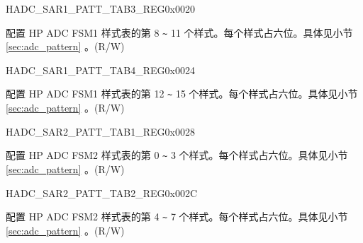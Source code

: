 \begin{register}{H}{ADC\_SAR1\_PATT\_TAB3\_REG}{0x0020}\label{regdesc:ADCSAR1PATTTAB3REG}
%
%
\regnewline%
\begin{regdesc}\begin{reglist}
\label{fielddesc:ADCSAR1PATTTAB3}\item [ADC\_SAR1\_PATT\_TAB3] 配置 HP ADC FSM1 样式表的第 8 \verb+~+ 11 个样式。每个样式占六位。具体见小节 \ref{sec:adc_pattern} \textit{}。(R/W)
\end{reglist}\end{regdesc}
\end{register}


\begin{register}{H}{ADC\_SAR1\_PATT\_TAB4\_REG}{0x0024}\label{regdesc:ADCSAR1PATTTAB4REG}
%
%
\regnewline%
\begin{regdesc}\begin{reglist}
\label{fielddesc:ADCSAR1PATTTAB4}\item [ADC\_SAR1\_PATT\_TAB4] 配置 HP ADC FSM1 样式表的第 12 \verb+~+ 15 个样式。每个样式占六位。具体见小节 \ref{sec:adc_pattern} \textit{}。(R/W)
\end{reglist}\end{regdesc}
\end{register}


\begin{register}{H}{ADC\_SAR2\_PATT\_TAB1\_REG}{0x0028}\label{regdesc:ADCSAR2PATTTAB1REG}
%
%
\regnewline%
\begin{regdesc}\begin{reglist}
\label{fielddesc:ADCSAR2PATTTAB1}\item [ADC\_SAR2\_PATT\_TAB1] 配置 HP ADC FSM2 样式表的第 0 \verb+~+ 3 个样式。每个样式占六位。具体见小节 \ref{sec:adc_pattern} \textit{}。(R/W)
\end{reglist}\end{regdesc}
\end{register}


\begin{register}{H}{ADC\_SAR2\_PATT\_TAB2\_REG}{0x002C}\label{regdesc:ADCSAR2PATTTAB2REG}
%
%
\regnewline%
\begin{regdesc}\begin{reglist}
\label{fielddesc:ADCSAR2PATTTAB2}\item [ADC\_SAR2\_PATT\_TAB2] 配置 HP ADC FSM2 样式表的第 4 \verb+~+ 7 个样式。每个样式占六位。具体见小节 \ref{sec:adc_pattern} \textit{}。(R/W)
\end{reglist}\end{regdesc}
\end{register}


